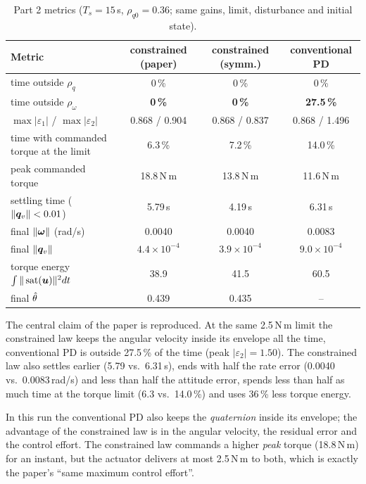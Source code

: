 \begin{table}[H]
\centering\small
\setlength{\tabcolsep}{3.5pt}
\caption{Part 2 metrics ($T_s=15$\,s, $\rho_{q0}=0.36$; same gains, limit, disturbance and initial state).}
\label{tab:part2}
\footnotesize
\begin{tabular}{@{}lccc@{}}
\toprule
\textbf{Metric} & \textbf{constrained (paper)} & \textbf{constrained (symm.)} & \textbf{conventional PD}\\
\midrule
time outside $\rho_q$ & 0\,\% & 0\,\% & 0\,\%\\
time outside $\rho_\omega$ & \textbf{0\,\%} & \textbf{0\,\%} & \textbf{27.5\,\%}\\
$\max|\varepsilon_1|$ / $\max|\varepsilon_2|$ & 0.868 / 0.904 & 0.868 / 0.837 & 0.868 / 1.496\\
time with commanded torque at the limit & 6.3\,\% & 7.2\,\% & 14.0\,\%\\
peak commanded torque & 18.8\,N\,m & 13.8\,N\,m & 11.6\,N\,m\\
settling time ($\|\bm{q}_v\|<0.01$) & 5.79\,s & 4.19\,s & 6.31\,s\\
final $\|\bm{\omega}\|$ (rad/s) & 0.0040 & 0.0040 & 0.0083\\
final $\|\bm{q}_v\|$ & $4.4\times10^{-4}$ & $3.9\times10^{-4}$ & $9.0\times10^{-4}$\\
torque energy $\int\|\operatorname{sat}(\bm{u})\|^2dt$ & 38.9 & 41.5 & 60.5\\
final $\hat{\theta}$ & 0.439 & 0.435 & --\\
\bottomrule
\end{tabular}
\end{table}

\begin{projbox}[result]
The central claim of the paper is reproduced. At the same 2.5\,N\,m limit the constrained law keeps the angular velocity
inside its envelope all the time, conventional PD is outside 27.5\,\% of the time (peak $|\varepsilon_2|=1.50$). The
constrained law also settles earlier (5.79 vs.\ 6.31\,s), ends with half the rate error (0.0040 vs.\ 0.0083\,rad/s) and less
than half the attitude error, spends less than half as much time at the torque limit (6.3 vs.\ 14.0\,\%) and uses 36\,\%
less torque energy.
\end{projbox}

\begin{warn}
In this run the conventional PD also keeps the \emph{quaternion} inside its envelope; the advantage of the constrained
law is in the angular velocity, the residual error and the control effort. The constrained law commands a higher
\emph{peak} torque (18.8\,N\,m) for an instant, but the actuator delivers at most 2.5\,N\,m to both, which is exactly the
paper's ``same maximum control effort''.
\end{warn}

